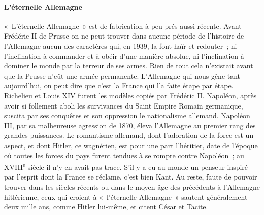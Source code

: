 \documentclass[french,twoside]{book} %
\begin{document}
\paragraph[{L'éternelle Allemagne}]{L'éternelle Allemagne}
\noindent \par
« L'éternelle Allemagne » est de fabrication à peu prés aussi récente. Avant Frédéric II de Prusse on ne peut trouver dans aucune période de l'histoire de l'Allemagne aucun des caractères qui, en 1939, la font haïr et redouter ; ni l'inclination à commander et à obéir d'une manière absolue, ni l'inclination à dominer le monde par la terreur de ses armes. Rien de tout cela n'existait avant que la Prusse n'eût une armée permanente. L'Allemagne qui nous gêne tant aujourd'hui, on peut dire que c'est la France qui l'a faite étape par étape. Richelieu et Louis XIV furent les modèles copiés par Frédéric II. Napoléon, après avoir si follement aboli les survivances du Saint Empire Ro­main germanique, suscita par ses conquêtes et son oppression le nationalisme allemand. Napoléon III, par sa malheureuse agression de 1870, éleva l'Alle­magne au premier rang des grandes puissances. Le romantisme allemand, dont l'adoration de la force est un aspect, et dont Hitler, ce wagnérien, est pour une part l'héritier, date de l'époque où toutes les forces du pays furent tendues à se rompre contre Napoléon ; au XVIII\textsuperscript{e} siècle il n'y en avait pas trace. S'il y a eu au monde un penseur inspiré par l'esprit dont la France se réclame, c'est bien Kant. Au reste, faute de pouvoir trouver dans les siècles récents ou dans le moyen âge des précédents à l'Allemagne hitlérienne, ceux qui croient à « l'éternelle Allemagne » sautent généralement deux mille ans, comme Hitler lui-même, et citent César et Tacite.
\end{document}
